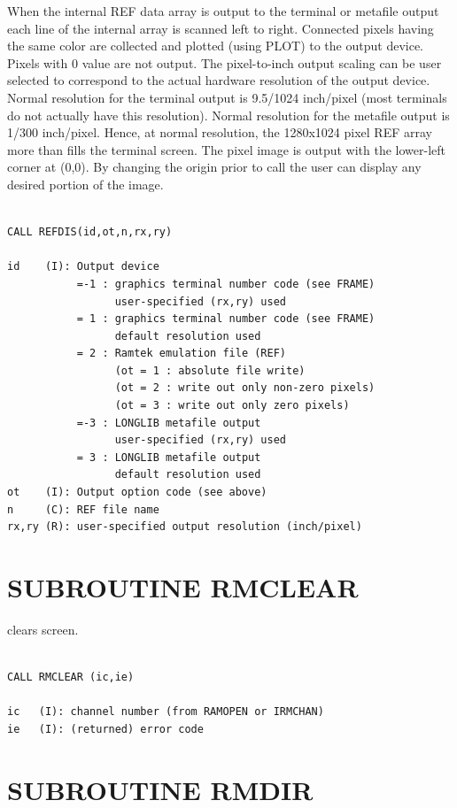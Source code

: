 \documentclass[11pt]{report}
\begin{document}
When the internal REF data array is output to the terminal or metafile
output each line of the internal array is scanned left to right.  Connected
pixels having the same color are collected and plotted (using PLOT) to the
output device. Pixels with 0 value are not output.  The pixel-to-inch
output scaling can be user selected to correspond to the actual hardware
resolution of the output device.  Normal resolution for the terminal output
is 9.5/1024 inch/pixel (most terminals do not actually have this resolution).
Normal resolution for the metafile output is 1/300 inch/pixel.  
Hence, at normal resolution, the 1280x1024 pixel REF array more than
fills the terminal screen.  The pixel image is output with the lower-left
corner at (0,0).  By changing the origin prior to call the user can 
display any desired portion of the image.
\begin{verbatim}

CALL REFDIS(id,ot,n,rx,ry)

id    (I): Output device
           =-1 : graphics terminal number code (see FRAME)
                 user-specified (rx,ry) used
           = 1 : graphics terminal number code (see FRAME)
                 default resolution used
           = 2 : Ramtek emulation file (REF)
                 (ot = 1 : absolute file write)
                 (ot = 2 : write out only non-zero pixels)
                 (ot = 3 : write out only zero pixels)
           =-3 : LONGLIB metafile output
                 user-specified (rx,ry) used
           = 3 : LONGLIB metafile output
                 default resolution used
ot    (I): Output option code (see above)
n     (C): REF file name
rx,ry (R): user-specified output resolution (inch/pixel)
\end{verbatim}

\section{SUBROUTINE RMCLEAR}

 clears  screen.
\begin{verbatim}

CALL RMCLEAR (ic,ie)

ic   (I): channel number (from RAMOPEN or IRMCHAN)
ie   (I): (returned) error code
\end{verbatim}

\section{SUBROUTINE RMDIR}
\end{document}
